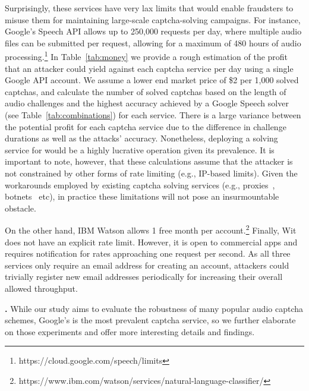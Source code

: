 Surprisingly, these services have very lax limits that would enable fraudsters to misuse
them for maintaining large-scale captcha-solving campaigns. For instance, Google's Speech API allows up
to 250,000 requests per day, where multiple audio files can be submitted per request, allowing for a maximum of
480 hours of audio processing.\footnote{https://cloud.google.com/speech/limits}
In Table~\ref{tab:money} we provide a rough estimation of the profit that an attacker could yield against 
each captcha service per day using a single Google API account. We assume a lower end market price of \$2 
per 1,000 solved captchas, and calculate the number of solved captchas based on the length of audio challenges 
and the highest accuracy achieved by a Google Speech solver (see Table~\ref{tab:combinations}) for each service.
There is a large variance between the potential profit for each captcha service due to the difference in challenge
durations as well as the attacks' accuracy. Nonetheless, deploying a solving service for \re would be a highly lucrative
operation given its prevalence.
It is important to note, however, that these calculations assume that the attacker 
is not constrained by other forms of rate limiting (e.g., IP-based limits). Given the workarounds employed
by existing captcha solving services (e.g., proxies~\cite{captcha_proxies}, botnets~\cite{captcha_solvers} etc), 
in practice these limitations will not pose an insurmountable obstacle.

On the other hand, IBM Watson allows 1 free month per account.\footnote{https://www.ibm.com/watson/services/natural-language-classifier/}
Finally, Wit does not have an explicit rate limit. However, it is open to commercial
apps and requires notification for rates approaching one request per second. As all three services
only require an email address for creating an account, attackers could trivially register 
new email addresses periodically for increasing their overall allowed throughput.




\textbf{\re.} While our study aims to evaluate the robustness of many popular audio captcha schemes,
Google's \re is the most prevalent captcha service, so we further elaborate on those experiments 
and offer more interesting details and findings.

